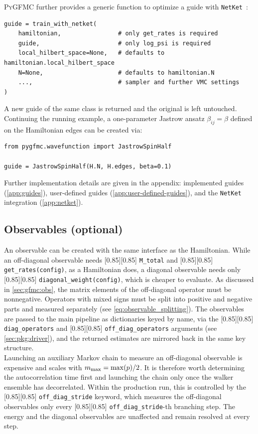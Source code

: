 \documentclass{SciPost}
\newcommand{\pyinline}[1]{\begingroup\setlength{\fboxsep}{0pt}%
  \colorbox{gray!15}{\raisebox{0pt}[0.85\ht\strutbox][0.85\dp\strutbox]{%
    \hspace{1pt}\lstinline{#1}\hspace{1pt}}}\endgroup}
\providecommand{\PyGFMC}{\textsc{PyGFMC}}
\begin{document}
\PyGFMC{} further provides a generic function to optimize a guide with \texttt{NetKet}~\cite{SciPostPhysCodeb.7,SciPostPhysCodeb.7-r3.4}:
\begin{lstlisting}
guide = train_with_netket(
    hamiltonian,                # only get_rates is required
    guide,                      # only log_psi is required
    local_hilbert_space=None,   # defaults to hamiltonian.local_hilbert_space
    N=None,                     # defaults to hamiltonian.N
    ...,                        # sampler and further VMC settings
)
\end{lstlisting}
A new guide of the same class is returned and the original is left untouched.\\


Continuing the running example, a one-parameter Jastrow ansatz $\beta_{ij} = \beta$ defined on the Hamiltonian edges can be created via:
\begin{lstlisting}
from pygfmc.wavefunction import JastrowSpinHalf

guide = JastrowSpinHalf(H.N, H.edges, beta=0.1)
\end{lstlisting}
Further implementation details are given in the appendix: implemented guides (\autoref{app:guides}), user-defined guides (\autoref{app:user-defined-guides}), and the \texttt{NetKet}~\cite{SciPostPhysCodeb.7,SciPostPhysCodeb.7-r3.4} integration (\autoref{app:netket}).

\subsection{Observables (optional)}\label{sec:pkg:obs}
An observable can be created with the same interface as the Hamiltonian.
%
While an off-diagonal observable needs \pyinline{M_total} and \pyinline{get_rates(config)}, as a Hamiltonian does, a diagonal observable needs only \pyinline{diagonal_weight(config)}, which is cheaper to evaluate.
%
As discussed in \autoref{sec:gfmc:obs}, the matrix elements of the off-diagonal operator must be nonnegative.
%
Operators with mixed signs must be split into positive and negative parts and measured separately (see \autoref{eq:observable_splitting}).
%
The observables are passed to the main pipeline as dictionaries keyed by name, via the \pyinline{diag_operators} and \pyinline{off_diag_operators} arguments (see \autoref{sec:pkg:driver}), and the returned estimates are mirrored back in the same key structure.\\

Launching an auxiliary Markov chain to measure an off-diagonal observable is expensive and scales with $m_{\rm max}=\max(p)/2$.
%
It is therefore worth determining the autocorrelation time first and launching the chain only once the walker ensemble has decorrelated.
%
Within the production run, this is controlled by the \pyinline{off_diag_stride} keyword, which measures the off-diagonal observables only every \pyinline{off_diag_stride}-th branching step.
%
The energy and the diagonal observables are unaffected and remain resolved at every step.\\
\end{document}
